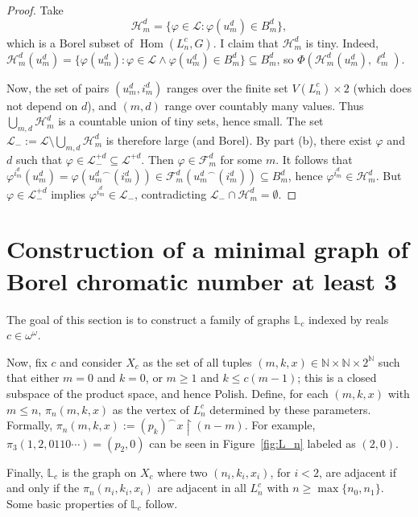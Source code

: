 \documentclass[11pt]{article}
\theoremstyle{plain}
\theoremstyle{definition}
\theoremstyle{remark}
\DeclareMathOperator{\Hom}{Hom}
\begin{document}
\begin{proof}
    Take $$\mathcal H^d_m=\{\varphi\in\mathcal L:\varphi(u^d_m)\in B^d_m\},$$ which is a Borel subset of $\Hom(L^c_n,G)$.
    I claim that $\mathcal H^d_m$ is tiny.
    Indeed, $\mathcal H^d_m(u^d_m)=\{\varphi(u^d_m):\varphi\in\mathcal L\land\varphi(u^d_m)\in B^d_m\}\subseteq B^d_m$, so $\Phi(\mathcal H^d_m(u^d_m),\ell^d_m)$.
    
    Now, the set of pairs $(u^d_m,i^d_m)$ ranges over the finite set $V(L^c_n)\times2$ (which does not depend on $d$), and $(m,d)$ range over countably many values.
    Thus $\bigcup_{m,d}\mathcal H^d_m$ is a countable union of tiny sets, hence small.
    The set $\mathcal L_-:=\mathcal L\setminus\bigcup_{m,d}\mathcal H^d_m$ is therefore large (and Borel).
    By part (b), there exist $\varphi$ and $d$ such that $\varphi\in\mathcal L_-^{+d}\subseteq\mathcal L^{+d}$.
    Then $\varphi\in\mathcal F^d_m$ for some $m$.
    It follows that $\varphi^{i^d_m}(u^d_m)=\varphi({u^d_m}^\smallfrown(i^d_m))\in\mathcal F^d_m({u^d_m}^\smallfrown(i^d_m))\subseteq B^d_m$, hence $\varphi^{i^d_m}\in\mathcal H^d_m$.
    But $\varphi\in\mathcal L_-^{+d}$ implies $\varphi^{i^d_m}\in\mathcal L_-$, contradicting $\mathcal L_-\cap\mathcal H^d_m=\emptyset$.
\end{proof}

\section{Construction of a minimal graph of Borel chromatic number at least 3}\label{sec:L0-construction}

The goal of this section is to construct a family of graphs $\mathbb L_c$ indexed by reals $c\in\omega^\omega$.

Now, fix $c$ and consider $X_c$ as the set of all tuples $(m,k,x)\in\mathbb N\times\mathbb N\times2^\mathbb N$ such that either $m=0$ and $k=0$, or $m\geq1$ and $k\leq c(m-1)$; this is a closed subspace of the product space, and hence Polish.
Define, for each $(m,k,x)$ with $m\leq n$, $\pi_n(m,k,x)$ as the vertex of $L^c_n$ determined by these parameters.
Formally, $\pi_n(m,k,x):=(p_k)^\smallfrown x\restriction(n-m)$.
For example, $\pi_3(1,2,0110\cdots)=(p_2,0)$ can be seen in Figure~\ref{fig:L_n} labeled as $(2,0)$.

Finally, $\mathbb L_c$ is the graph on $X_c$ where two $(n_i,k_i,x_i)$, for $i<2$, are adjacent if and only if the $\pi_n(n_i,k_i,x_i)$ are adjacent in all $L^c_n$ with $n\geq\max\{n_0,n_1\}$.
Some basic properties of $\mathbb L_c$ follow.
\end{document}

